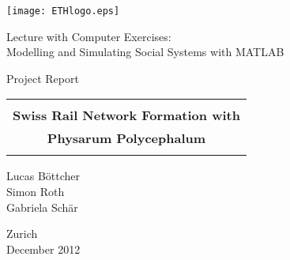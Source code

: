 
\thispagestyle{empty}

\begin{center}
\texttt{[image: ETHlogo.eps]}

\bigskip


\bigskip


\bigskip


\LARGE{ 	Lecture with Computer Exercises:\\ }
\LARGE{ Modelling and Simulating Social Systems with MATLAB\\}

\bigskip

\bigskip

\small{Project Report}\\

\bigskip

\bigskip

\bigskip

\bigskip


\begin{tabular}{|c|}
\hline
\\
\textbf{\LARGE{Swiss Rail Network Formation with}}\\
\textbf{\LARGE{Physarum Polycephalum}}\\
\\
\hline
\end{tabular}
\bigskip

\bigskip

\bigskip

\LARGE{Lucas Böttcher \\ Simon Roth \\ Gabriela Schär}



\bigskip

\bigskip

\bigskip

\bigskip

\bigskip

\bigskip

\bigskip

\bigskip

Zurich\\
December 2012\\

\end{center}


